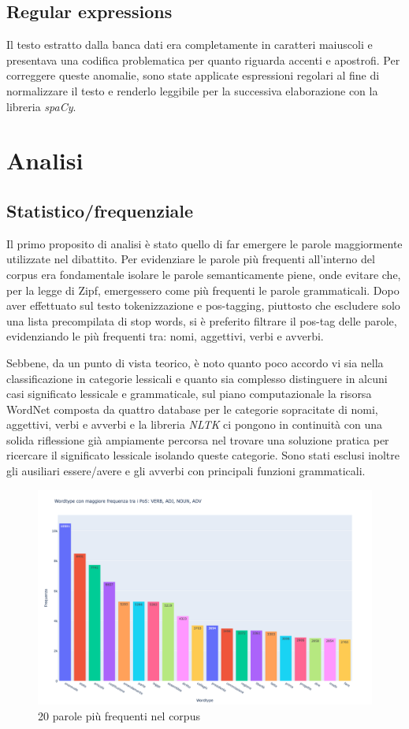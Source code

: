 \documentclass[11pt,twocolumn]{article}
\begin{document}
\subsection {Regular expressions}
Il testo estratto dalla banca dati era completamente in caratteri maiuscoli e presentava una codifica problematica per quanto riguarda accenti e apostrofi. Per correggere queste anomalie, sono state applicate espressioni regolari al fine di normalizzare il testo e renderlo leggibile per la successiva elaborazione con la libreria \textit{spaCy}.
\section{Analisi}

\subsection {Statistico/frequenziale}

Il primo proposito di analisi è stato quello di far emergere le parole maggiormente utilizzate nel dibattito. Per evidenziare le parole più frequenti all'interno del corpus era fondamentale isolare le parole semanticamente piene, onde evitare che, per la legge di Zipf, emergessero come più frequenti le parole grammaticali. Dopo aver effettuato sul testo tokenizzazione e pos-tagging, piuttosto che escludere solo una lista precompilata di stop words, si è preferito filtrare il pos-tag delle parole, evidenziando le più frequenti tra: nomi, aggettivi, verbi e avverbi. 

Sebbene, da un punto di vista teorico, è noto quanto poco accordo vi sia nella classificazione in categorie lessicali e quanto sia complesso distinguere in alcuni casi significato lessicale e grammaticale,  sul piano computazionale la risorsa WordNet composta da quattro database per le categorie sopracitate di nomi, aggettivi, verbi e avverbi e la libreria \textit{NLTK} ci pongono in continuità con una solida riflessione già ampiamente percorsa nel trovare una soluzione pratica per ricercare il significato lessicale isolando queste categorie. Sono stati esclusi inoltre gli ausiliari essere/avere e gli avverbi con principali funzioni grammaticali. 

\begin{figure}

    \centering
    \includegraphics[width=0.9\linewidth]{newplot.png}
    \caption{20 parole più frequenti nel corpus}
    \label{fig:enter-label}
\end{figure}
\end{document}

